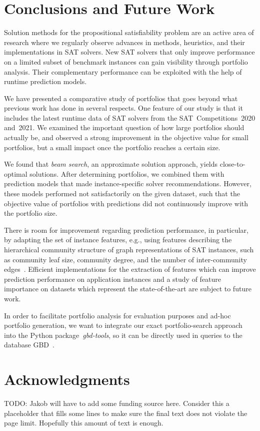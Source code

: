 \documentclass[conference]{IEEEtran}
\newcommand{\todo}[1]{{\color{red}TODO: #1}}
\begin{document}
\section{Conclusions and Future Work}
\label{sec:conclusion}

Solution methods for the propositional satisfiability problem are an active area of research where we regularly observe advances in methods, heuristics, and their implementations in SAT solvers. 
New SAT solvers that only improve performance on a limited subset of benchmark instances can gain visibility through portfolio analysis. 
Their complementary performance can be exploited with the help of runtime prediction models. 

We have presented a comparative study of portfolios that goes beyond what previous work has done in several respects.
One feature of our study is that it includes the latest runtime data of SAT solvers from the SAT~Competitions~2020 and~2021. 
We examined the important question of how large portfolios should actually be, and observed a strong improvement in the objective value for small portfolios, but a small impact once the portfolio reaches a certain size.

We found that \emph{beam search}, an approximate solution approach, yields close-to-optimal solutions.
After determining portfolios, we combined them with prediction models that made instance-specific solver recommendations.
However, these models performed not satisfactorily on the given dataset, such that the objective value of portfolios with predictions did not continuously improve with the portfolio size.

There is room for improvement regarding prediction performance, in particular, by adapting the set of instance features,
e.g., using features describing the hierarchical community structure of graph representations of SAT instances, such as community leaf size, community degree, and the number of inter-community edges~\cite{Ansotegui:2017:StructureFeatures,Li:2021:HCS}. 
Efficient implementations for the extraction of features which can improve prediction performance on application instances and a study of feature importance on datasets which represent the state-of-the-art are subject to future work. 

In order to facilitate portfolio analysis for evaluation purposes and ad-hoc portfolio generation, we want to integrate our exact portfolio-search approach into the Python package~\emph{gbd-tools}, so it can be directly used in queries to the database GBD~\cite{iser2020collaborative}. 

\section*{Acknowledgments}

\todo{Jakob will have to add some funding source here. Consider this a placeholder that fills some lines to make sure the final text does not violate the page limit. Hopefully this amount of text is enough.}

\balance %



\end{document}
